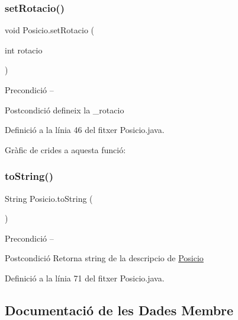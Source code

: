 \subsubsection{\texorpdfstring{set\+Rotacio()}{setRotacio()}}
{\footnotesize\ttfamily void Posicio.\+set\+Rotacio (\begin{DoxyParamCaption}\item[{int}]{rotacio }\end{DoxyParamCaption})}

\begin{DoxyPrecond}{Precondició}
-- 
\end{DoxyPrecond}
\begin{DoxyPostcond}{Postcondició}
defineix la \+\_\+rotacio 
\end{DoxyPostcond}


Definició a la línia 46 del fitxer Posicio.\+java.

Gràfic de crides a aquesta funció\+:
\mbox{\label{class_posicio_aa150553319e5f09a7de09f7d0065b290}} 
\subsubsection{\texorpdfstring{to\+String()}{toString()}}
{\footnotesize\ttfamily String Posicio.\+to\+String (\begin{DoxyParamCaption}{ }\end{DoxyParamCaption})}

\begin{DoxyPrecond}{Precondició}
-- 
\end{DoxyPrecond}
\begin{DoxyPostcond}{Postcondició}
Retorna string de la descripcio de \mbox{\hyperlink{class_posicio}{Posicio}} 
\end{DoxyPostcond}


Definició a la línia 71 del fitxer Posicio.\+java.



\subsection{Documentació de les Dades Membre}
\mbox{\label{class_posicio_afd8482e5bb3de8a1ad2da5143f81b3a5}} 
